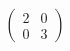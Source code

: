 \documentclass[preview]{standalone}
\begin{document}
\begin{align*}
\begin{pmatrix} 2 & 0\\ 0 & 3 \end{pmatrix}
\end{align*}
\end{document}
